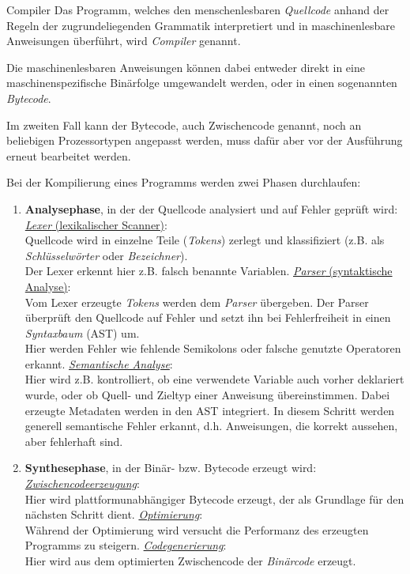 \documentclass[german]{spicker}
\begin{document}
\begin{defi}{Compiler}
    Das Programm, welches den
    menschenlesbaren \emph{Quellcode} anhand der Regeln der zugrundeliegenden Grammatik
    interpretiert und in maschinenlesbare Anweisungen überführt, wird \emph{Compiler} genannt.

    Die maschinenlesbaren Anweisungen können dabei entweder direkt in eine
    maschinenspezifische Binärfolge umgewandelt werden, oder in einen sogenannten
    \emph{Bytecode}.

    Im zweiten Fall kann der Bytecode,
    auch Zwischencode genannt, noch an beliebigen Prozessortypen angepasst werden,
    muss dafür aber vor der Ausführung erneut bearbeitet werden.

    Bei der Kompilierung eines Programms werden zwei Phasen durchlaufen:
    \begin{enumerate}
        \item \textbf{Analysephase}, in der der Quellcode analysiert und auf Fehler geprüft wird:
              \subitem \underline{\emph{Lexer} (lexikalischer Scanner)}: \\
              Quellcode wird in einzelne Teile (\emph{Tokens}) zerlegt und klassifiziert (z.B. als \emph{Schlüsselwörter} oder \emph{Bezeichner}).\\
              Der Lexer erkennt hier z.B. falsch benannte Variablen.
              \subitem \underline{\emph{Parser} (syntaktische Analyse)}: \\
              Vom Lexer erzeugte \emph{Tokens} werden dem \emph{Parser} übergeben.
              Der Parser überprüft den Quellcode auf Fehler und setzt ihn bei Fehlerfreiheit in einen \emph{Syntaxbaum} (AST) um.\\
              Hier werden Fehler wie fehlende Semikolons oder falsche genutzte Operatoren erkannt.
              \subitem \underline{\emph{Semantische Analyse}}: \\
              Hier wird z.B. kontrolliert, ob eine verwendete Variable auch vorher deklariert wurde, oder ob Quell- und Zieltyp einer Anweisung übereinstimmen. Dabei erzeugte Metadaten werden in den AST integriert.
              In diesem Schritt werden generell semantische Fehler erkannt, d.h. Anweisungen, die korrekt aussehen, aber fehlerhaft sind.
              \\
        \item \textbf{Synthesephase}, in der Binär- bzw. Bytecode erzeugt wird:
              \subitem \underline{\emph{Zwischencodeerzeugung}}: \\
              Hier wird plattformunabhängiger Bytecode erzeugt, der als Grundlage für den nächsten Schritt dient.
              \subitem \underline{\emph{Optimierung}}: \\
              Während der Optimierung wird versucht die Performanz des erzeugten Programms zu steigern.
              \subitem \underline{\emph{Codegenerierung}}: \\
              Hier wird aus dem optimierten Zwischencode der \emph{Binärcode} erzeugt.
    \end{enumerate}
\end{defi}
\end{document}
